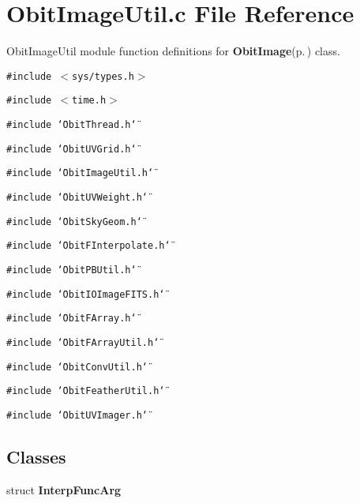 \section{Obit\-Image\-Util.c File Reference}
\label{ObitImageUtil_8c}
Obit\-Image\-Util module function definitions for {\bf Obit\-Image}{\rm (p.\,\pageref{structObitImage})} class. 

{\tt \#include $<$sys/types.h$>$}\par
{\tt \#include $<$time.h$>$}\par
{\tt \#include \char`\"{}Obit\-Thread.h\char`\"{}}\par
{\tt \#include \char`\"{}Obit\-UVGrid.h\char`\"{}}\par
{\tt \#include \char`\"{}Obit\-Image\-Util.h\char`\"{}}\par
{\tt \#include \char`\"{}Obit\-UVWeight.h\char`\"{}}\par
{\tt \#include \char`\"{}Obit\-Sky\-Geom.h\char`\"{}}\par
{\tt \#include \char`\"{}Obit\-FInterpolate.h\char`\"{}}\par
{\tt \#include \char`\"{}Obit\-PBUtil.h\char`\"{}}\par
{\tt \#include \char`\"{}Obit\-IOImage\-FITS.h\char`\"{}}\par
{\tt \#include \char`\"{}Obit\-FArray.h\char`\"{}}\par
{\tt \#include \char`\"{}Obit\-FArray\-Util.h\char`\"{}}\par
{\tt \#include \char`\"{}Obit\-Conv\-Util.h\char`\"{}}\par
{\tt \#include \char`\"{}Obit\-Feather\-Util.h\char`\"{}}\par
{\tt \#include \char`\"{}Obit\-UVImager.h\char`\"{}}\par
\subsection*{Classes}
\begin{CompactItemize}
\item 
struct {\bf Interp\-Func\-Arg}
\end{CompactItemize}
